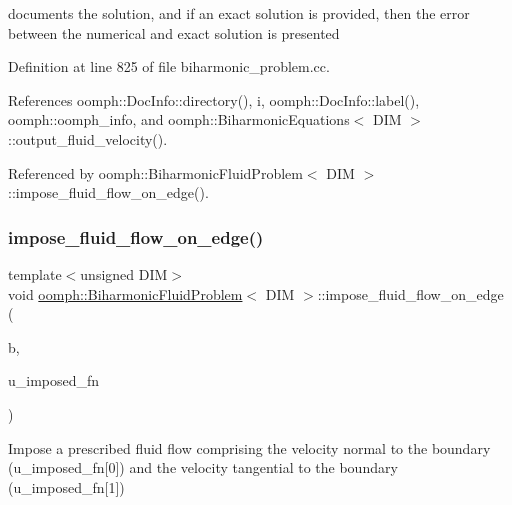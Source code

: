 documents the solution, and if an exact solution is provided, then the error between the numerical and exact solution is presented 



Definition at line 825 of file biharmonic\+\_\+problem.\+cc.



References oomph\+::\+Doc\+Info\+::directory(), i, oomph\+::\+Doc\+Info\+::label(), oomph\+::oomph\+\_\+info, and oomph\+::\+Biharmonic\+Equations$<$ D\+I\+M $>$\+::output\+\_\+fluid\+\_\+velocity().



Referenced by oomph\+::\+Biharmonic\+Fluid\+Problem$<$ D\+I\+M $>$\+::impose\+\_\+fluid\+\_\+flow\+\_\+on\+\_\+edge().

\mbox{\label{classoomph_1_1BiharmonicFluidProblem_a1006320d9024555042645ed6347ff8fb}} 
\subsubsection{\texorpdfstring{impose\+\_\+fluid\+\_\+flow\+\_\+on\+\_\+edge()}{impose\_fluid\_flow\_on\_edge()}}
{\footnotesize\ttfamily template$<$unsigned D\+IM$>$ \\
void \hyperlink{classoomph_1_1BiharmonicFluidProblem}{oomph\+::\+Biharmonic\+Fluid\+Problem}$<$ D\+IM $>$\+::impose\+\_\+fluid\+\_\+flow\+\_\+on\+\_\+edge (\begin{DoxyParamCaption}\item[{const unsigned \&}]{b,  }\item[{\hyperlink{classoomph_1_1BiharmonicFluidProblem_a93661d3b0c52bd82fd58496f9f853079}{Fluid\+B\+C\+Fct\+Pt}}]{u\+\_\+imposed\+\_\+fn }\end{DoxyParamCaption})\hspace{0.3cm}{\ttfamily [protected]}}



Impose a prescribed fluid flow comprising the velocity normal to the boundary (u\+\_\+imposed\+\_\+fn\mbox{[}0\mbox{]}) and the velocity tangential to the boundary (u\+\_\+imposed\+\_\+fn\mbox{[}1\mbox{]}) 



